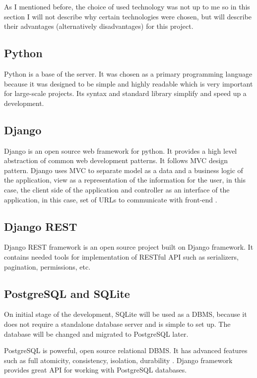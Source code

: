 As I mentioned before, the choice of used technology was not up to me so in this section I will not describe why
certain technologies were chosen, but will describe their advantages (alternatively disadvantages) for this project.


\subsection{Python}
Python is a base of the server. It was chosen as a primary programming language because it was designed to be simple
and highly readable which is very important for large-scale projects. Its syntax and standard library simplify and
speed up a development.

\subsection{Django}
Django is an open source web framework for python. It provides a high level abstraction of common web development
patterns. It follows \ac{MVC} design pattern. Django uses \ac{MVC} to separate model as a data and a business logic of
the application, view as a representation of the information for the user, in this case, the client side of the
application and controller as an interface of the application, in this case, set of URLs to communicate with
front-end \cite{django}.

\subsection{Django REST}
Django REST framework is an open source project built on Django framework. It contains needed tools for implementation
of \ac{REST}ful \ac{API} such as serializers, pagination, permissions, etc.

\subsection{PostgreSQL and SQLite}
On initial stage of the development, SQLite will be used as a \ac{DBMS}, because it does not require a standalone
database server and is simple to set up. The database will be changed and migrated to PostgreSQL later.

PostgreSQL is powerful, open source relational \ac{DBMS}. It has advanced features such as full
atomicity, consistency, isolation, durability \cite{postgres}. Django framework provides great \ac{API} for working
with PostgreSQL databases.

